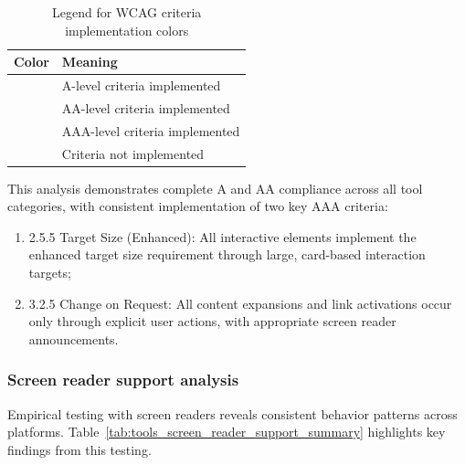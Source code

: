 \begin{table}[ht]
\caption{Legend for WCAG criteria implementation colors}
\label{tab:wcag_legend_tools}
\centering
\begin{tabular}{|C{3cm}|C{8cm}|}
\hline
\textbf{Color} & \textbf{Meaning} \\
\hline
{\color{green}} & A-level criteria implemented \\
\hline
{\color{blue}} & AA-level criteria implemented \\
\hline
{\color{purple}} & AAA-level criteria implemented \\
\hline
{\color{red}} & Criteria not implemented \\
\hline
\end{tabular}
\end{table}
\FloatBarrier

This analysis demonstrates complete A and AA compliance across all tool categories, with consistent implementation of two key AAA criteria:

\begin{enumerate}
    \item 2.5.5 Target Size (Enhanced): All interactive elements implement the enhanced target size requirement through large, card-based interaction targets;
    
    \item 3.2.5 Change on Request: All content expansions and link activations occur only through explicit user actions, with appropriate screen reader announcements.
\end{enumerate}

\subsubsection{Screen reader support analysis}
\label{subsubsec:tools-screen-reader-support-summary}

Empirical testing with screen readers reveals consistent behavior patterns across platforms. Table~\ref{tab:tools_screen_reader_support_summary} highlights key findings from this testing.

